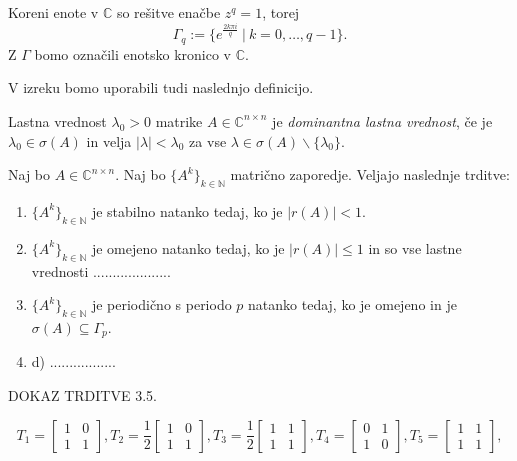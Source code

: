\documentclass[mat1]{fmfdelo}
\newcommand{\N}{\mathbb N}
\newcommand{\C}{\mathbb C}
\begin{document}
Koreni enote v $\C$ so rešitve enačbe $z^q = 1$, torej
\begin{equation}
    \Gamma_q := \{e^{\frac{2 k \pi i}{q}}\ |\ k = 0, \ldots, q - 1\}.
\end{equation}
Z $\Gamma$ bomo označili enotsko kronico v $\C$.

V izreku bomo uporabili tudi naslednjo definicijo.
\begin{definicija}
    Lastna vrednost $\lambda_0 > 0$ matrike $A \in \C^{n \times n}$ je \emph{dominantna lastna vrednost}, če je $\lambda_0 \in \sigma(A)$ in velja $|\lambda| < \lambda_0$ za vse $\lambda \in \sigma(A) \backslash \{\lambda_0\}$.
\end{definicija}
\begin{izrek}
    Naj bo $A \in \C^{n \times n}$. Naj bo $\{A^k\}_{k\in\N}$ matrično zaporedje. Veljajo naslednje trditve:
    \begin{enumerate}
        \item $\{A^k\}_{k\in\N}$ je stabilno natanko tedaj, ko je $|r(A)| < 1$.
        \item $\{A^k\}_{k\in\N}$ je omejeno natanko tedaj, ko je $|r(A)| \leq 1$ in so vse lastne vrednosti ....................
        \item $\{A^k\}_{k\in\N}$ je periodično s periodo $p$ natanko tedaj, ko je omejeno in je $\sigma(A) \subseteq \Gamma_p$.
        \item d) .................
    \end{enumerate}
\end{izrek}
\begin{dokaz}
    DOKAZ TRDITVE 3.5.
\end{dokaz}
\begin{zgled}
    \begin{equation}
        T_1 =
        \begin{bmatrix}
            1 & 0 \\
            1 & 1
        \end{bmatrix},
        T_2 = \frac{1}{2}
        \begin{bmatrix}
            1 & 0 \\
            1 & 1
        \end{bmatrix},
        T_3 = \frac{1}{2}
        \begin{bmatrix}
            1 & 1 \\
            1 & 1
        \end{bmatrix},
        T_4 =
        \begin{bmatrix}
            0 & 1 \\
            1 & 0
        \end{bmatrix},
        T_5 =
        \begin{bmatrix}
            1 & 1 \\
            1 & 1
        \end{bmatrix},
    \end{equation}
\end{zgled}
\end{document}
